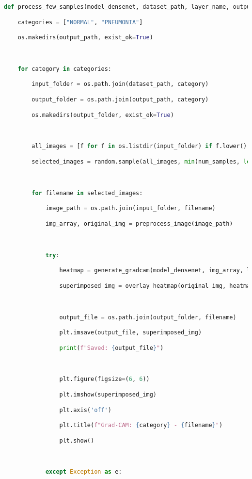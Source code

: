 \documentclass{article}
\begin{document}
\begin{lstlisting}[style=mystyle,language=Python]
def process_few_samples(model_densenet, dataset_path, layer_name, output_path, num_samples=5):

    categories = ["NORMAL", "PNEUMONIA"]

    os.makedirs(output_path, exist_ok=True)



    for category in categories:

        input_folder = os.path.join(dataset_path, category)

        output_folder = os.path.join(output_path, category)

        os.makedirs(output_folder, exist_ok=True)



        all_images = [f for f in os.listdir(input_folder) if f.lower().endswith(('.jpg', '.jpeg', '.png'))]

        selected_images = random.sample(all_images, min(num_samples, len(all_images)))



        for filename in selected_images:

            image_path = os.path.join(input_folder, filename)

            img_array, original_img = preprocess_image(image_path)



            try:

                heatmap = generate_gradcam(model_densenet, img_array, layer_name)

                superimposed_img = overlay_heatmap(original_img, heatmap)



                output_file = os.path.join(output_folder, filename)

                plt.imsave(output_file, superimposed_img)

                print(f"Saved: {output_file}")



                plt.figure(figsize=(6, 6))

                plt.imshow(superimposed_img)

                plt.axis('off')

                plt.title(f"Grad-CAM: {category} - {filename}")

                plt.show()



            except Exception as e:


\end{lstlisting}
\end{document}
